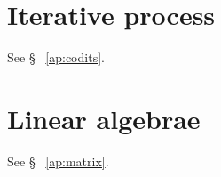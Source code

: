 
%
%
%
%


\section{Iterative process}\label{sec:algebrea_iterative_process}
See \S~ \ref{ap:codits}.

\section{Linear algebrae}
See \S~ \ref{ap:matrix}.
